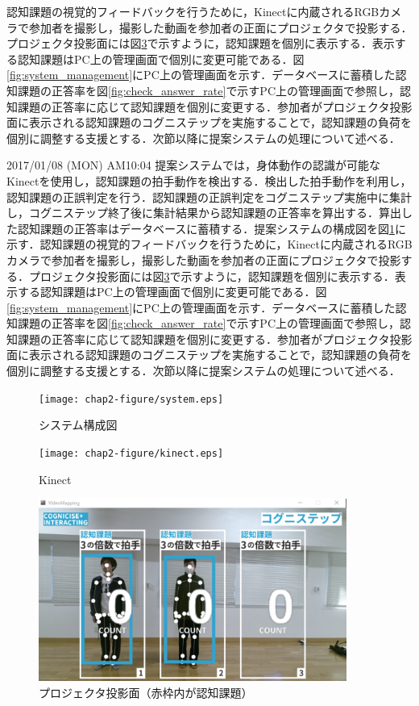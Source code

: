 認知課題の視覚的フィードバックを行うために，Kinectに内蔵されるRGBカメラで参加者を撮影し，撮影した動画を参加者の正面にプロジェクタで投影する．プロジェクタ投影面には図\ref{fig:projection_surface}で示すように，認知課題を個別に表示する．表示する認知課題はPC上の管理画面で個別に変更可能である．図\ref{fig:system_management}にPC上の管理画面を示す．データベースに蓄積した認知課題の正答率を図\ref{fig:check_answer_rate}で示すPC上の管理画面で参照し，認知課題の正答率に応じて認知課題を個別に変更する．参加者がプロジェクタ投影面に表示される認知課題のコグニステップを実施することで，認知課題の負荷を個別に調整する支援とする．次節以降に提案システムの処理について述べる．

2017/01/08 (MON) AM10:04
提案システムでは，身体動作の認識が可能なKinectを使用し，認知課題の拍手動作を検出する．検出した拍手動作を利用し，認知課題の正誤判定を行う．認知課題の正誤判定をコグニステップ実施中に集計し，コグニステップ終了後に集計結果から認知課題の正答率を算出する．算出した認知課題の正答率はデータベースに蓄積する．提案システムの構成図を図\ref{fig:system}に示す．認知課題の視覚的フィードバックを行うために，Kinectに内蔵されるRGBカメラで参加者を撮影し，撮影した動画を参加者の正面にプロジェクタで投影する．プロジェクタ投影面には図\ref{fig:projection_surface}で示すように，認知課題を個別に表示する．表示する認知課題はPC上の管理画面で個別に変更可能である．図\ref{fig:system_management}にPC上の管理画面を示す．データベースに蓄積した認知課題の正答率を図\ref{fig:check_answer_rate}で示すPC上の管理画面で参照し，認知課題の正答率に応じて認知課題を個別に変更する．参加者がプロジェクタ投影面に表示される認知課題のコグニステップを実施することで，認知課題の負荷を個別に調整する支援とする．次節以降に提案システムの処理について述べる．
\fi


\begin{figure}[tbp]
	\centering
			\texttt{[image: chap2-figure/system.eps]}
	\caption{システム構成図}
	\label{fig:system}
\end{figure}

\begin{figure}[tbp]
	\centering
			\texttt{[image: chap2-figure/kinect.eps]}
	\caption{Kinect}
	\label{fig:kinect}
\end{figure}
\fi

\begin{figure}[tbp]
	\centering
			\includegraphics[width=0.9\textwidth]{chap2-figure/vm_init.eps}
	\caption{プロジェクタ投影面（赤枠内が認知課題）}
	\label{fig:projection_surface}
\end{figure}

